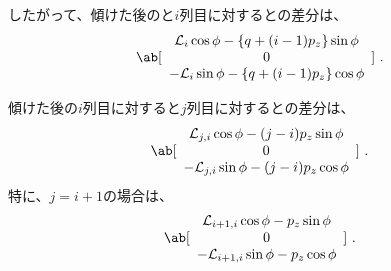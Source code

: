 したがって、傾けた後の\TopCurvatureCenter と$i$列目に対する\CurvatureCenter との差分は、
\begin{align}
  \label{eq:afterPhidimpleCenterDistance}
  \ab[
  \begin{array}{c}
    \mathcal L_i\cos\phi-\{q+(i-1)p_z\}\sin\phi\\
    0\\
    -\mathcal L_i\sin\phi-\{q+(i-1)p_z\}\cos\phi
  \end{array}
  ]\ .
\end{align}
\begin{hosoku}
傾けた後の$i$列目に対する\CurvatureCenter と$j$列目に対する\CurvatureCenter との差分は、
\begin{align*}
  \ab[
  \begin{array}{c}
    \mathcal L_{j,i}\cos\phi-(j-i)p_z\sin\phi\\
    0\\
    -\mathcal L_{j,i}\sin\phi-(j-i)p_z\cos\phi
  \end{array}
  ]\ .
\end{align*}
特に、$j = i+1$の場合は、
\begin{align*}
  \ab[
  \begin{array}{c}
    \mathcal L_{i+1,i}\cos\phi-p_z\sin\phi\\
    0\\
    -\mathcal L_{i+1,i}\sin\phi-p_z\cos\phi
  \end{array}
  ]\ .
\end{align*}
\end{hosoku}

